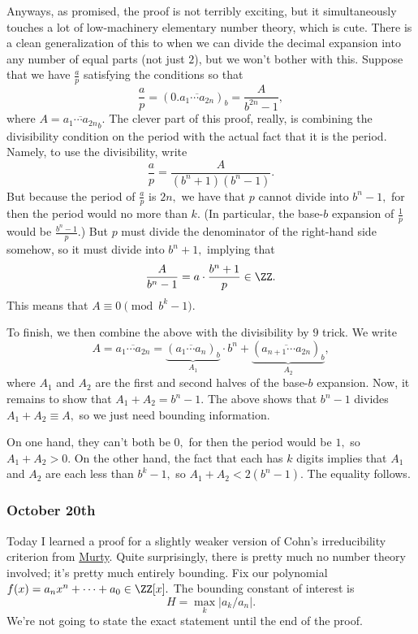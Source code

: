 Anyways, as promised, the proof is not terribly exciting, but it simultaneously touches a lot of low-machinery elementary number theory, which is cute. There is a clean generalization of this to when we can divide the decimal expansion into any number of equal parts (not just $2$), but we won't bother with this. Suppose that we have $\frac ap$ satisfying the conditions so that
\[\frac ap=(0.\overline{a_1\cdots a_{2n}})_b=\frac A{b^{2n}-1},\]
where $A=\overline{a_1\cdots a_{2n}}_b.$ The clever part of this proof, really, is combining the divisibility condition on the period with the actual fact that it is the period. Namely, to use the divisibility, write
\[\frac ap=\frac A{\left(b^n+1\right)\left(b^n-1\right)}.\]
But because the period of $\frac ap$ is $2n,$ we have that $p$ cannot divide into $b^n-1,$ for then the period would no more than $k.$ (In particular, the base-$b$ expansion of $\frac 1p$ would be $\frac{b^n-1}p.$) But $p$ must divide the denominator of the right-hand side somehow, so it must divide into $b^n+1,$ implying that
\[\frac A{b^n-1}=a\cdot\frac{b^n+1}p\in\ZZ.\]
This means that $A\equiv0\pmod{b^k-1}.$

To finish, we then combine the above with the divisibility by $9$ trick. We write
\[A=\overline{a_1\cdots a_{2n}}=\underbrace{(\overline{a_1\cdots a_n})_b}_{A_1}\cdot b^n+\underbrace{(\overline{a_{n+1}\cdots a_{2n}})_b}_{A_2},\]
where $A_1$ and $A_2$ are the first and second halves of the base-$b$ expansion. Now, it remains to show that $A_1+A_2=b^n-1.$ The above shows that $b^n-1$ divides $A_1+A_2\equiv A,$ so we just need bounding information.

On one hand, they can't both be $0,$ for then the period would be $1,$ so $A_1+A_2>0.$ On the other hand, the fact that each has $k$ digits implies that $A_1$ and $A_2$ are each less than $b^k-1,$ so $A_1+A_2<2\left(b^n-1\right).$ The equality follows.

\subsubsection{October 20th}
Today I learned a proof for a slightly weaker version of Cohn's irreducibility criterion from \href{https://mast.queensu.ca/~murty/murty.pdf}{Murty}. Quite surprisingly, there is pretty much no number theory involved; it's pretty much entirely bounding. Fix our polynomial $f(x)=a_nx^n+\cdots+a_0\in\ZZ[x].$ The bounding constant of interest is
\[H=\max_k|a_k/a_n|.\]
We're not going to state the exact statement until the end of the proof.

